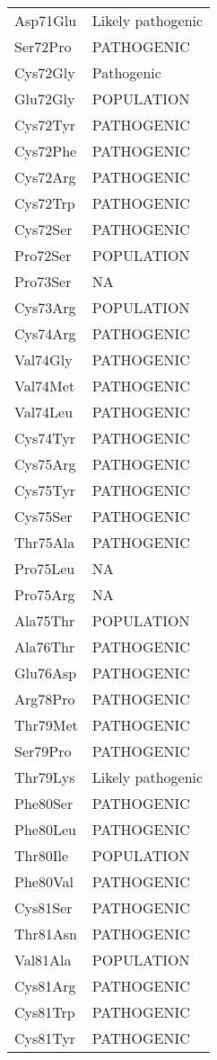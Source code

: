 \begin{longtable}[l]{l|l}
	Asp71Glu & Likely pathogenic \\
	Ser72Pro & PATHOGENIC \\
	Cys72Gly & Pathogenic \\
	Glu72Gly & POPULATION \\
	Cys72Tyr & PATHOGENIC \\
	Cys72Phe & PATHOGENIC \\
	Cys72Arg & PATHOGENIC \\
	Cys72Trp & PATHOGENIC \\
	Cys72Ser & PATHOGENIC \\
	Pro72Ser & POPULATION \\
	Pro73Ser & NA \\
	Cys73Arg & POPULATION \\
	Cys74Arg & PATHOGENIC \\
	Val74Gly & PATHOGENIC \\
	Val74Met & PATHOGENIC \\
	Val74Leu & PATHOGENIC \\
	Cys74Tyr & PATHOGENIC \\
	Cys75Arg & PATHOGENIC \\
	Cys75Tyr & PATHOGENIC \\
	Cys75Ser & PATHOGENIC \\
	Thr75Ala & PATHOGENIC \\
	Pro75Leu & NA \\
	Pro75Arg & NA \\
	Ala75Thr & POPULATION \\
	Ala76Thr & PATHOGENIC \\
	Glu76Asp & PATHOGENIC \\
	Arg78Pro & PATHOGENIC \\
	Thr79Met & PATHOGENIC \\
	Ser79Pro & PATHOGENIC \\
	Thr79Lys & Likely pathogenic \\
	Phe80Ser & PATHOGENIC \\
	Phe80Leu & PATHOGENIC \\
	Thr80Ile & POPULATION \\
	Phe80Val & PATHOGENIC \\
	Cys81Ser & PATHOGENIC \\
	Thr81Asn & PATHOGENIC \\
	Val81Ala & POPULATION \\
	Cys81Arg & PATHOGENIC \\
	Cys81Trp & PATHOGENIC \\
	Cys81Tyr & PATHOGENIC \\

\end{longtable}

